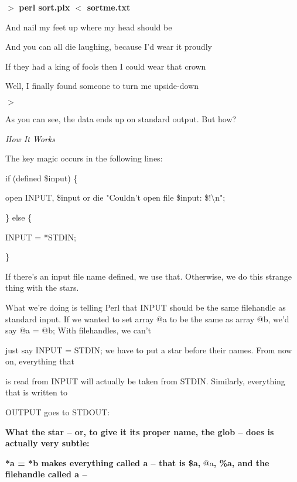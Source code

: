 \documentclass[a4paper,11pt]{book}
\begin{document}
\noindent $>$ \textbf{perl sort.plx $<$ sortme.txt}

\noindent And nail my feet up where my head should be

\noindent And you can all die laughing, because I'd wear it proudly

\noindent If they had a king of fools then I could wear that crown

\noindent Well, I finally found someone to turn me upside-down

\noindent $>$

\noindent 

\noindent As you can see, the data ends up on standard output. But how?

\noindent 

\noindent \textit{How It Works}

\noindent The key magic occurs in the following lines:

\noindent 

\noindent if (defined \$input) \{

\noindent open INPUT, \$input or die "Couldn't open file \$input: \$!\textbackslash n";

\noindent \} else \{

\noindent *INPUT = *STDIN;

\noindent \}

\noindent 

\noindent If there's an  input file name defined,  we  use  that.  Otherwise,  we  do  this strange  thing  with  the  stars.

\noindent What we're  doing is telling Perl  that  INPUT should  be  the  same  filehandle  as  standard  input.  If  we wanted to  set array @a to  be the  same  as  array  @b,  we'd  say  @a = @b; With  filehandles,  we  can't

\noindent just say INPUT = STDIN; we  have  to  put  a  star  before  their  names.  From  now  on,  everything  that

\noindent is  read from INPUT will actually  be  taken  from  STDIN.  Similarly,  everything  that  is  written  to

\noindent OUTPUT goes to STDOUT:

\noindent 

\noindent 

\noindent \textbf{What the star -- or, to give it its proper name, the glob -- does is actually very subtle:}

\noindent \textbf{*a = *b makes everything called a --  that is \$a, }@a\textbf{, \%a, and the filehandle called a --}
\end{document}
